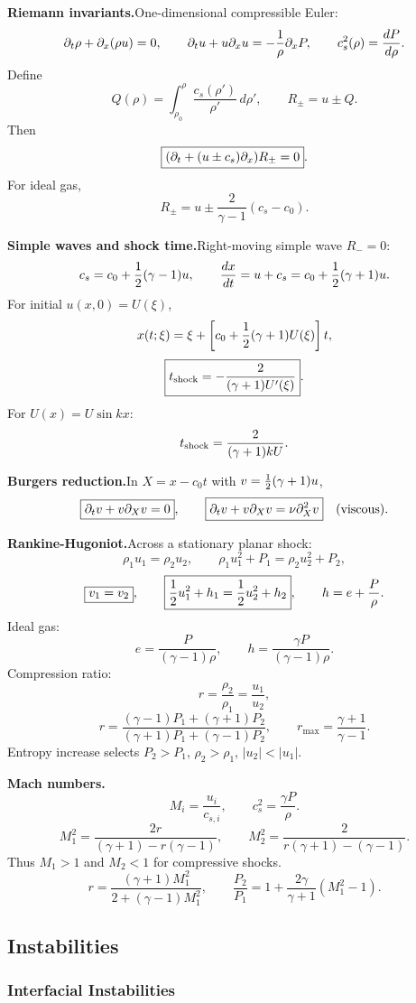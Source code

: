 \noindent\textbf{Riemann invariants.}\quad One-dimensional compressible Euler:
\[
  \partial_t\rho+\partial_x(\rho u)=0,\qquad
  \partial_tu+u\partial_xu=-\frac1\rho\partial_xP,
  \qquad
  c_s^2(\rho)=\frac{dP}{d\rho}.
\]
Define
\[
  Q(\rho)=\int_{\rho_0}^{\rho}\frac{c_s(\rho')}{\rho'}\,d\rho',
  \qquad
  R_\pm=u\pm Q.
\]
Then
\[
  \boxed{(\partial_t+(u\pm c_s)\partial_x)R_\pm=0}.
\]
For ideal gas,
\[
  R_\pm=u\pm\frac{2}{\gamma-1}(c_s-c_0).
\]

\noindent\textbf{Simple waves and shock time.}\quad Right-moving simple wave $R_-=0$:
\[
  c_s=c_0+\frac{1}{2}(\gamma-1)u,
  \qquad
  \frac{dx}{dt}=u+c_s=c_0+\frac{1}{2}(\gamma+1)u.
\]
For initial $u(x,0)=U(\xi)$,
\[
  x(t;\xi)=\xi+\left[c_0+\frac{1}{2}(\gamma+1)U(\xi)\right]t,
\]
\[
  \boxed{t_{\rm shock}=-\frac{2}{(\gamma+1)U'(\xi)}}.
\]
For $U(x)=U\sin kx$:
\[
  t_{\rm shock}=\frac{2}{(\gamma+1)kU}.
\]

\noindent\textbf{Burgers reduction.}\quad In $X=x-c_0t$ with $v=\frac{1}{2}(\gamma+1)u$,
\[
  \boxed{\partial_tv+v\partial_Xv=0},
  \qquad
  \boxed{\partial_tv+v\partial_Xv=\nu\partial_X^2v}\quad({\rm viscous}).
\]

\noindent\textbf{Rankine-Hugoniot.}\quad Across a stationary planar shock:
\[
  \boxed{\rho_1u_1=\rho_2u_2},
  \qquad
  \boxed{\rho_1u_1^2+P_1=\rho_2u_2^2+P_2},
\]
\[
  \boxed{v_1=v_2},
  \qquad
  \boxed{\frac{1}{2} u_1^2+h_1=\frac{1}{2} u_2^2+h_2},
  \qquad
  h=e+\frac{P}{\rho}.
\]
Ideal gas:
\[
  e=\frac{P}{(\gamma-1)\rho},\qquad h=\frac{\gamma P}{(\gamma-1)\rho}.
\]
Compression ratio:
\[
  r=\frac{\rho_2}{\rho_1}=\frac{u_1}{u_2},
\]
\[
  \boxed{r=\frac{(\gamma-1)P_1+(\gamma+1)P_2}
  {(\gamma+1)P_1+(\gamma-1)P_2}},
  \qquad
  r_{\max}=\frac{\gamma+1}{\gamma-1}.
\]
Entropy increase selects $P_2>P_1$, $\rho_2>\rho_1$, $|u_2|<|u_1|$.

\noindent\textbf{Mach numbers.}\quad
\[
  M_i=\frac{u_i}{c_{s,i}},
  \qquad
  c_s^2=\frac{\gamma P}{\rho}.
\]
\[
  \boxed{M_1^2=\frac{2r}{(\gamma+1)-r(\gamma-1)}},
  \qquad
  \boxed{M_2^2=\frac{2}{r(\gamma+1)-(\gamma-1)}}.
\]
Thus $M_1>1$ and $M_2<1$ for compressive shocks.
\[
  \boxed{r=\frac{(\gamma+1)M_1^2}{2+(\gamma-1)M_1^2}},
  \qquad
  \boxed{\frac{P_2}{P_1}=1+\frac{2\gamma}{\gamma+1}(M_1^2-1)}.
\]

\subsection{Instabilities}

\subsubsection*{Interfacial Instabilities}

